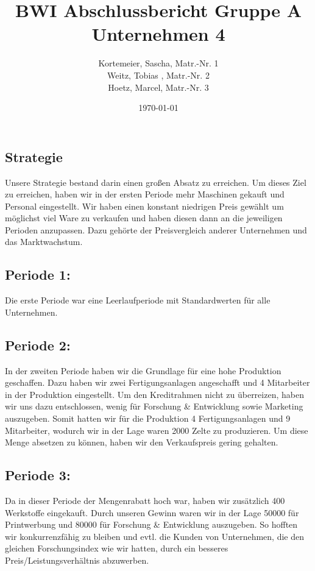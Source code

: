 \documentclass[a4paper, 12pt]{report}
\title{BWI Abschlussbericht Gruppe A Unternehmen 4}
\author{Kortemeier, Sascha, Matr.-Nr. 1 \\
Weitz, Tobias , Matr.-Nr. 2 \\
Hoetz, Marcel, Matr.-Nr. 3}
\date{\today}
\begin{document}
\maketitle
\tableofcontents


\begin{flushleft}
\chapter{Strategie}
Unsere Strategie bestand darin einen großen Absatz zu erreichen. 
Um dieses Ziel zu erreichen, haben wir in der ersten Periode mehr Maschinen gekauft und Personal eingestellt. 
Wir haben einen konstant niedrigen Preis gewählt um möglichst viel Ware zu verkaufen und haben diesen dann an die jeweiligen Perioden anzupassen. 
Dazu gehörte der Preisvergleich anderer Unternehmen und das Marktwachstum. 

\section{Periode 1:}
Die erste Periode war eine Leerlaufperiode mit Standardwerten für alle Unternehmen.	

\section{Periode 2:}
In der zweiten Periode haben wir die Grundlage für eine hohe Produktion geschaffen.
Dazu haben wir zwei Fertigungsanlagen angeschafft und 4 Mitarbeiter in der Produktion eingestellt.
Um den Kreditrahmen nicht zu überreizen, haben wir uns dazu entschlossen, wenig für Forschung \& Entwicklung sowie Marketing auszugeben.
Somit hatten wir für die Produktion 4 Fertigungsanlagen und 9 Mitarbeiter, wodurch wir in der Lage waren 2000 Zelte zu produzieren.
Um diese Menge absetzen zu können, haben wir den Verkaufspreis gering gehalten.

\section{Periode 3:}
Da in dieser Periode der Mengenrabatt hoch war, haben wir zusätzlich 400 Werkstoffe eingekauft. 
Durch unseren Gewinn waren wir in der Lage 50000\texteuro{} für Printwerbung und 80000\texteuro{} für Forschung \& Entwicklung auszugeben.
So hofften wir konkurrenzfähig zu bleiben und evtl. die Kunden von Unternehmen, die den gleichen Forschungsindex wie wir hatten, durch ein besseres Preis/Leistungsverhältnis abzuwerben.


\end{flushleft}
\end{document}
